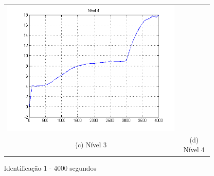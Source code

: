 \begin{figure}[H]
\begin{tabular}{cc}
		\includegraphics[height=0.2\paperheight,keepaspectratio]{img/sim1_h4.png} \\
		(c) Nível 3 &
		(d) Nível 4
	\end{tabular}
	\caption{\label{imgID_4000} Identificação 1 - 4000 segundos}
\end{figure}

